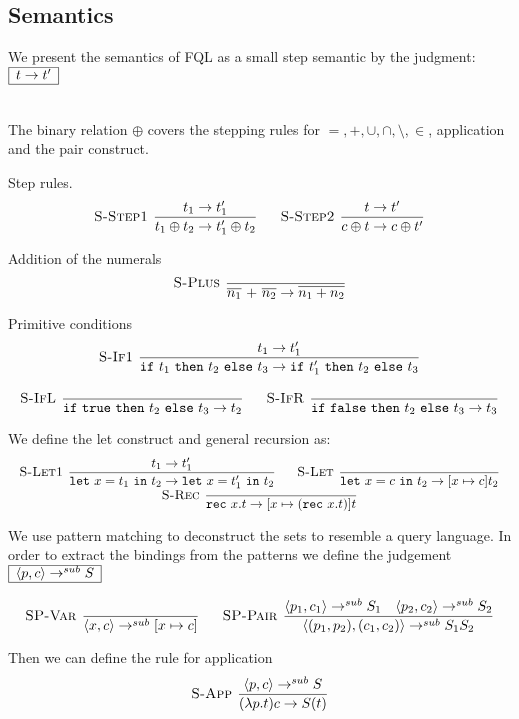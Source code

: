 \documentclass[a4paper]{article}
\newcommand{\s}[1]{\mathtt{#1}}
\newcommand{\sif}{\s{if\ }}
\newcommand{\sthen}{\s{\ then\ }}
\newcommand{\selse}{\s{\ else\ }}
\newcommand{\sifthenelse}[3]{\sif #1 \sthen #2 \selse #3}
\newcommand{\sletin}[2]{\s{let\ } #1 \s{\ in\ } #2}
\newcommand{\srec}{\s{rec\ }}
\newcommand{\strue}{\s{true}}
\newcommand{\sfalse}{\s{false}}
\newcommand{\step}{\to}
\newcommand{\stepsub}{\step^{sub}}
\newcommand{\angled}[1]{\langle #1\rangle}
\renewcommand{\rule}[3][]{\ \mbox{\textsc{#1 }}\dfrac{#2}{#3}\ }
\newcommand{\smbox}[1]{
  $\begin{array}{|c|}
    \hline
    #1 \\
    \hline
  \end{array}$
}
\begin{document}
\subsection{Semantics\label{sec:semantics}}
We present the semantics of FQL as a small step semantic by the judgment: \smbox{t \step t'}
\\
The binary relation $\oplus$ covers the stepping rules for $= ,+,\cup, \cap,\setminus,\in$, application and the pair construct.

Step rules.
\[\begin{array}{c}
\rule[S-Step1]{t_1 \step t_1'}{t_1 \oplus t_2 \step t_1' \oplus t_2}\quad
\rule[S-Step2]{t \step t'}{c \oplus t \step c \oplus t'}
\end{array}
\]

Addition of the numerals
\[
\rule[S-Plus]{}{\overline{n_1} \s{\ +\ } \overline{n_2} \step \overline{n_1 + n_2}}
\]

Primitive conditions
\[\begin{array}{c}
\rule[S-If1]{t_1 \step t_1'}{\sifthenelse{t_1}{t_2}{t_3} \step \sifthenelse{t_1'}{t_2}{t_3}}\\\\
\rule[S-IfL]{}{\sifthenelse{\strue}{t_2}{t_3} \step t_2}\quad
\rule[S-IfR]{}{\sifthenelse{\sfalse}{t_2}{t_3} \step t_3}
\end{array}\]

We define the let construct and general recursion as:
\[\begin{array}{c}
\rule[S-Let1]{t_1 \step t_1'}
  {\sletin{x=t_1}{t_2} \step \sletin{x=t_1'}{t_2}}\quad
\rule[S-Let]{}{\sletin{x=c}{t_2} \step [x \mapsto c ] t_2}\\
\rule[S-Rec]{}{\srec x.t \step [x \mapsto (\srec x.t)] t}
\end{array}\]


We use pattern matching to deconstruct the sets to resemble a query language.
In order to extract the bindings from the patterns we define the judgement \smbox{\angled{p,c} \stepsub S}
\[
\rule[SP-Var]{}{\angled{x,c} \stepsub [x\mapsto c]}\quad
\rule[SP-Pair]{\angled{p_1, c_1} \stepsub S_1 \quad \angled{p_2, c_2} \stepsub S_2}
{\angled{(p_1,p_2), (c_1, c_2)} \stepsub S_1S_2}
\]

Then we can define the rule for application
\[
\rule[S-App]{\angled{p, c} \stepsub S}{(\lambda p.t) c \step S(t)}
\]
\end{document}
